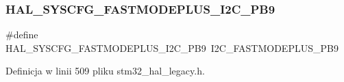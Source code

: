 \subsubsection{\texorpdfstring{H\+A\+L\+\_\+\+S\+Y\+S\+C\+F\+G\+\_\+\+F\+A\+S\+T\+M\+O\+D\+E\+P\+L\+U\+S\+\_\+\+I2\+C\+\_\+\+P\+B9}{HAL\_SYSCFG\_FASTMODEPLUS\_I2C\_PB9}}
{\footnotesize\ttfamily \#define H\+A\+L\+\_\+\+S\+Y\+S\+C\+F\+G\+\_\+\+F\+A\+S\+T\+M\+O\+D\+E\+P\+L\+U\+S\+\_\+\+I2\+C\+\_\+\+P\+B9~I2\+C\+\_\+\+F\+A\+S\+T\+M\+O\+D\+E\+P\+L\+U\+S\+\_\+\+P\+B9}



Definicja w linii 509 pliku stm32\+\_\+hal\+\_\+legacy.\+h.


